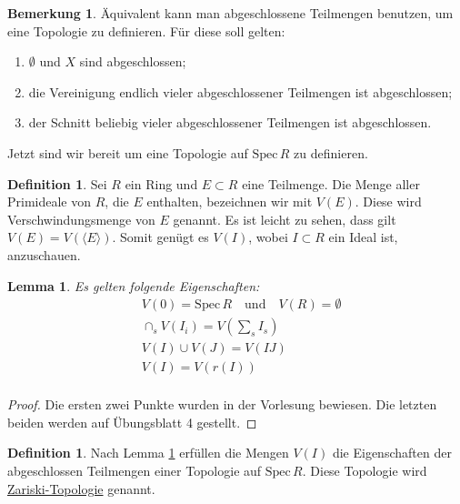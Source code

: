 \documentclass[reqno,12pt]{article}
\numberwithin{equation}{section}
\newcommand{\Spec}{\text{Spec}\,}
\theoremstyle{plain}
\newtheorem{lemma}[thm]{Lemma}
\theoremstyle{definition}
\newtheorem{definition}[thm]{Definition}
\newtheorem{example}[thm]{Beispiel}
\newtheorem{remark}[thm]{Bemerkung}
\begin{document}

\begin{remark}
  Äquivalent kann man abgeschlossene Teilmengen benutzen, um eine Topologie zu definieren. Für diese soll gelten:
  \begin{enumerate}
    \item $\emptyset$ und $X$ sind abgeschlossen;
    \item die Vereinigung endlich vieler abgeschlossener Teilmengen ist abgeschlossen;
    \item der Schnitt beliebig vieler abgeschlossener Teilmengen ist abgeschlossen.
  \end{enumerate}


\end{remark}


\noindent Jetzt sind wir bereit um eine Topologie auf $\Spec R$ zu definieren.

\begin{definition}
  Sei $R$ ein Ring und $E \subset R$ eine Teilmenge. Die Menge aller Primideale von $R$, die $E$ enthalten, bezeichnen wir mit $V(E)$. Diese wird {\sf Verschwindungsmenge} von $E$ genannt. Es ist leicht zu sehen, dass gilt $V(E) = V (\langle E \rangle)$. Somit genügt es $V(I)$, wobei $I \subset R$ ein Ideal ist, anzuschauen.
\end{definition}

\begin{lemma}\label{lemma-V(I)-define-topology}
Es gelten folgende Eigenschaften:
\begin{align*}
  & V(0) = \Spec R \quad \text{und}\quad V(R) = \emptyset \\
  & \cap_s V(I_i)  = V (\sum_s I_s) \\
  & V(I) \cup V(J) = V(IJ) \\
  & V (I) = V ( r(I) ) \\
\end{align*}
\end{lemma}

\begin{proof}
Die ersten zwei Punkte wurden in der Vorlesung bewiesen. Die letzten
beiden werden auf Übungsblatt 4 gestellt.
\end{proof}

\begin{definition}
Nach Lemma \ref{lemma-V(I)-define-topology} erfüllen die Mengen $V(I)$ die Eigenschaften der abgeschlossen Teilmengen einer Topologie auf $\Spec R$. Diese Topologie wird \href{https://en.wikipedia.org/wiki/Zariski_topology}{\sf Zariski-Topologie} genannt.
\end{definition}
\end{document}
